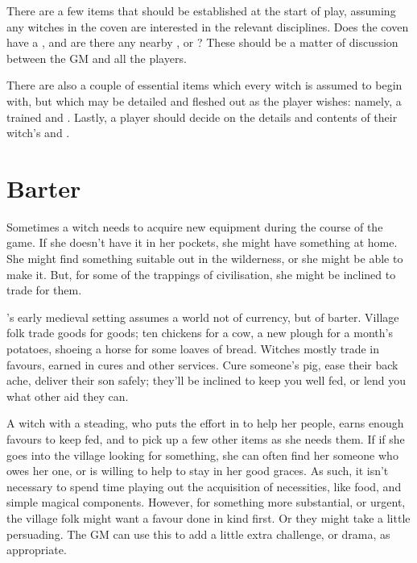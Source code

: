 There are a few items that should be established at the start of play, assuming any witches in the coven are interested in the relevant disciplines.
Does the coven have a , and are there any nearby , or ?
These should be a matter of discussion between the GM and all the players.

There are also a couple of essential items which every witch is assumed to begin with, but which may be detailed and fleshed out as the player wishes: namely, a trained {\broomstick} and {\thehat}.
Lastly, a player should decide on the details and contents of their witch's {\cottage} and {\garden}.



\section{Barter}

Sometimes a witch needs to acquire new equipment during the course of the game.
If she doesn't have it in her pockets, she might have something at home.
She might find something suitable out in the wilderness, or she might be able to make it.
But, for some of the trappings of civilisation, she might be inclined to trade for them.

's early medieval setting assumes a world not of currency, but of barter.
Village folk trade goods for goods; ten chickens for a cow, a new plough for a month's potatoes, shoeing a horse for some loaves of bread.
Witches mostly trade in favours, earned in cures and other services.
Cure someone's pig, ease their back ache, deliver their son safely; they'll be inclined to keep you well fed, or lend you what other aid they can.

A witch with a steading, who puts the effort in to help her people, earns enough favours to keep fed, and to pick up a few other items as she needs them.
If if she goes into the village looking for something, she can often find her someone who owes her one, or is willing to help to stay in her good graces.
As such, it isn't necessary to spend time playing out the acquisition of necessities, like food, and simple magical components.
However, for something more substantial, or urgent, the village folk might want a favour done in kind first.
Or they might take a little persuading.
The GM can use this to add a little extra challenge, or drama, as appropriate.



